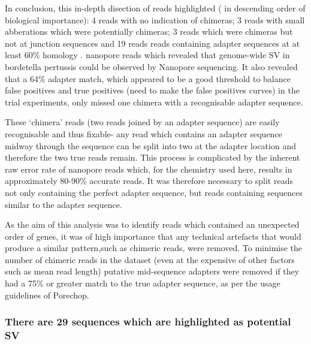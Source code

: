 In conclusion, this in-depth disection of reads highlighted ( in descending order of biological importance): 4 reads with  no indication of chimeras; 3 reads with small abberations which were potentially chimeras; 3 reads which were chimeras but not at junction sequences and 19 reads reads containing adapter sequences at at least 60\% homology . nanopore reads which revealed that genome-wide SV in bordetella pertussis could be observed by Nanopore sequencing. It also revealed that a 64\% adapter match, which appeared to be a good threshold to balance false positives and true positives (need to make the false positives curves) in the trial experiments, only missed one chimera with a recognisable adapter sequence.




These `chimera' reads (two reads joined by an adapter sequence) are easily recognisable and thus fixable- any read which contains an adapter sequence midway through the sequence can be split into two at the adapter location and therefore the two true reads remain. This process is complicated by the inherent raw error rate of nanopore reads which, for the chemistry used here, results in approximately 80-90\% accurate reads. It was therefore necessary to split reads not only containing the perfect adapter sequence, but reads containing sequences similar to the adapter sequence.


As the aim of this analysis was to identify reads which contained an unexpected order of genes, it was of high importance that any technical artefacts that would produce a similar pattern,such as chimeric reads, were removed. To minimise the number of chimeric reads in the dataset (even at the expensive of other factors such as mean read length) putative mid-sequence adapters were removed if they had a 75\% or greater match to the true adapter sequence, as per the usage guidelines of Porechop. 


\subsubsection{There are 29 sequences which are highlighted as potential SV}

